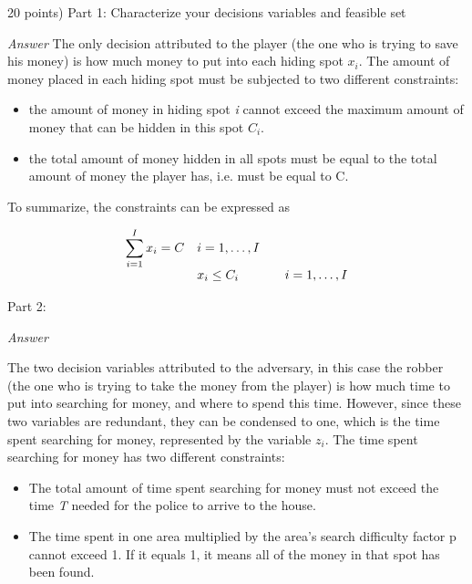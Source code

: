\documentclass[10pt]{article}
\newenvironment{exercise}[2][Exercise]{\begin{trivlist}
  \item[\hskip \labelsep {\bfseries #1}\hskip \labelsep {\bfseries #2.}]}{\end{trivlist}}
\begin{document}
\begin{exercise}{5}
(20 points)
Part 1: Characterize your decisions variables and feasible set

\textit{Answer}
The only decision attributed to the player (the one who is trying to save his money) is how much money to put into each hiding spot $x_i$. The amount of money placed in each hiding spot must be subjected to two different constraints:

\begin{itemize}
    \item the amount of money in hiding spot \textit{i} cannot exceed the maximum amount of money that can be hidden in this spot $C_i$.
    \item the total amount of money hidden in all spots must be equal to the total amount of money the player has, i.e. must be equal to C.
\end{itemize}

To summarize, the constraints can be expressed as

\begin{equation}
\begin{array}{ll@{}lll}

\displaystyle\sum\limits_{i=1}^{I} x_i = C && i=1 ,\dots, I \\
&& x_i \leq C_i && i=1 ,\dots, I\\

\end{array}
\end{equation}




Part 2:

\textit{Answer}

The two decision variables attributed to the adversary, in this case the robber (the one who is trying to take the money from the player) is how much time to put into searching for money, and where to spend this time. However, since these two variables are redundant, they can be condensed to one, which is the time spent searching for money, represented by the variable $z_i$. The time spent searching for money has two different constraints:

\begin{itemize}
    \item The total amount of time spent searching for money must not exceed the time \textit{T} needed for the police to arrive to the house.
    \item The time spent in one area multiplied by the area's search difficulty factor p cannot exceed 1. If it equals 1, it means all of the money in that spot has been found.
\end{itemize}


\end{exercise}
\end{document}
